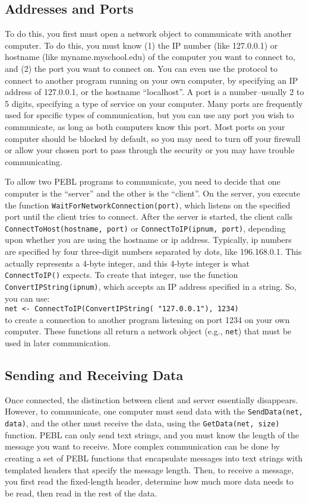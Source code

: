 \subsection{Addresses and Ports}
To do this, you first must open a network object to communicate with
another computer.  To do this, you must know (1) the IP number (like
127.0.0.1) or hostname (like myname.myschool.edu) of the computer you
want to connect to, and (2) the port you want to connect on. You can even
use the protocol to connect to another program running on your own
computer, by specifying an IP address of 127.0.0.1, or the hostname
``localhost''.  A port is
a number--usually 2 to 5 digits, specifying a type of service
on your computer. Many ports are frequently used for specific types of
communication, but you can use any port you wish to communicate, as
long as both computers know this port. Most ports on your computer
should be blocked by default, so you may need to turn off your
firewall or allow your chosen port to pass through the security or you
may have trouble communicating.

To allow two PEBL programs to communicate, you need to decide that one
computer is the ``server'' and the other is the ``client''.  On the
server, you execute the function
\texttt{WaitForNetworkConnection(port)}, which listens on the
specified port until the client tries to connect.  After the server is
started, the client calls \texttt{ConnectToHost(hostname, port)} or
\texttt{ConnectToIP(ipnum, port)}, depending upon whether you are using the
hostname or ip address.  Typically, ip numbers are specified by four
three-digit numbers separated by dots, like 196.168.0.1. This actually
represents a 4-byte integer, and this 4-byte integer is what
\texttt{ConnectToIP()} expects.  To create that integer, use the
function \\ \texttt{ConvertIPString(ipnum)}, which accepts an IP address
specified in a string.  So, you can use:\\
\texttt{net <- ConnectToIP(ConvertIPString( "127.0.0.1"), 1234)}\\
to create a
connection to another program listening on port 1234 on your own
computer.  These functions all return a network object (e.g.,
\texttt{net}) that must be
used in later communication.

\subsection{Sending and Receiving Data}
Once connected, the distinction between client and server essentially
disappears.  However, to communicate, one computer must send data with
the \texttt{SendData(net, data)}, and the other must receive the
data, using the \texttt{GetData(net, size)} function.  PEBL can
only send text strings, and you must know the length of the message
you want to receive.  More complex communication can be done by
creating a set of PEBL functions that encapsulate messages into text
strings with templated headers that specify the message length.  Then,
to receive a message, you first read the fixed-length header,
determine how much more data needs to be read, then read in the rest
of the data. 


